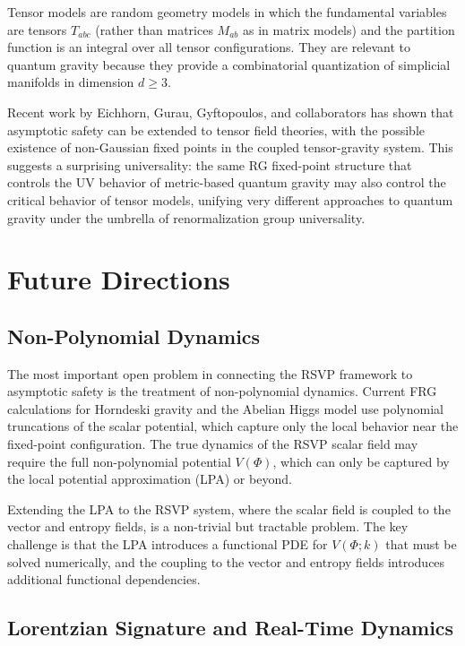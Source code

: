 \documentclass[12pt,a4paper,oneside]{book}
\theoremstyle{definition}
\theoremstyle{plain}
\theoremstyle{remark}
\begin{document}
Tensor models are random geometry models in which the fundamental variables
are tensors $T_{abc}$ (rather than matrices $M_{ab}$ as in matrix models)
and the partition function is an integral over all tensor configurations.
They are relevant to quantum gravity because they provide a combinatorial
quantization of simplicial manifolds in dimension $d \geq 3$.

Recent work by Eichhorn, Gurau, Gyftopoulos, and collaborators has shown
that asymptotic safety can be extended to tensor field theories, with the
possible existence of non-Gaussian fixed points in the coupled tensor-gravity
system. This suggests a surprising universality: the same RG fixed-point
structure that controls the UV behavior of metric-based quantum gravity may
also control the critical behavior of tensor models, unifying very different
approaches to quantum gravity under the umbrella of renormalization group
universality.

\chapter{Future Directions}

\section{Non-Polynomial Dynamics}

The most important open problem in connecting the RSVP framework to asymptotic
safety is the treatment of non-polynomial dynamics. Current FRG calculations
for Horndeski gravity and the Abelian Higgs model use polynomial truncations
of the scalar potential, which capture only the local behavior near the
fixed-point configuration. The true dynamics of the RSVP scalar field may
require the full non-polynomial potential $V(\Phi)$, which can only be captured
by the local potential approximation (LPA) or beyond.

Extending the LPA to the RSVP system, where the scalar field is coupled to the
vector and entropy fields, is a non-trivial but tractable problem. The key
challenge is that the LPA introduces a functional PDE for $V(\Phi; k)$ that
must be solved numerically, and the coupling to the vector and entropy fields
introduces additional functional dependencies.

\section{Lorentzian Signature and Real-Time Dynamics}
\end{document}
